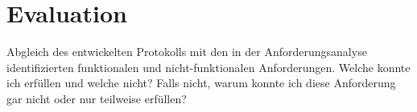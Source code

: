 \chapter{Evaluation}

Abgleich des entwickelten Protokolls mit den in der Anforderungsanalyse identifizierten funktionalen und
nicht-funktionalen Anforderungen. Welche konnte ich erfüllen und welche nicht? Falls nicht, warum
konnte ich diese Anforderung gar nicht oder nur teilweise erfüllen?